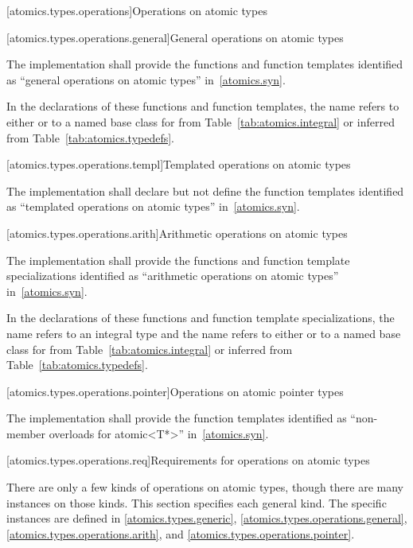 [atomics.types.operations]{Operations on atomic types}

[atomics.types.operations.general]{General operations on atomic types}

\pnum
The implementation shall provide the functions and function templates identified as ``general operations
on atomic types'' in~\ref{atomics.syn}.

\pnum
In the declarations of these functions and function templates, the name
 refers to either  or to a named base class for 
from Table~\ref{tab:atomics.integral} or inferred from Table~\ref{tab:atomics.typedefs}.

[atomics.types.operations.templ]{Templated operations on atomic types}

\pnum
The implementation shall declare but not define the
function templates identified as ``templated operations on atomic types'' in~\ref{atomics.syn}.

[atomics.types.operations.arith]{Arithmetic operations on atomic types}

\pnum
The implementation shall provide the functions and function template specializations identified as ``arithmetic operations
on atomic types'' in~\ref{atomics.syn}.

%
\pnum
In the declarations of these functions and function template specializations,
the name  refers to an
integral type and the name  refers to either
 or to a named base class for  from
Table~\ref{tab:atomics.integral} or inferred from Table~\ref{tab:atomics.typedefs}.

[atomics.types.operations.pointer]{Operations on atomic pointer types}
%

\pnum
The implementation shall provide the function templates identified as
``non-member overloads for atomic<T*>'' in~\ref{atomics.syn}.

[atomics.types.operations.req]{Requirements for operations on atomic types}

\pnum
There are only a few kinds of operations on atomic types, though there are many
instances on those kinds. This section specifies each general kind. The specific
instances are defined in
\ref{atomics.types.generic}, \ref{atomics.types.operations.general},
\ref{atomics.types.operations.arith}, and \ref{atomics.types.operations.pointer}.

